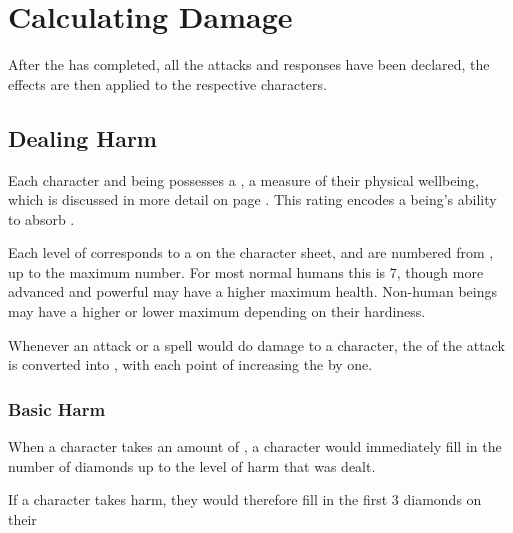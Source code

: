 \chapter{Calculating Damage}


After the  has completed, all the attacks and responses have been declared, the effects are then applied to the respective characters. 



\section{Dealing Harm}

Each character and being possesses a , a measure of their physical wellbeing, which is discussed in more detail on page \pageref{S:Health}. This  rating encodes a being's ability to absorb .

Each level of  corresponds to a  on the character sheet, and are numbered from , up to the maximum number. For most normal humans this is 7, though more advanced and powerful may have a higher maximum health. Non-human beings may have a higher or lower maximum  depending on their hardiness. 

Whenever an attack or a spell would do damage to a character, the  of the attack is converted into , with each point of  increasing the  by one.  

\subsection{Basic Harm}

When a character takes an amount of , a character would immediately fill in the number of diamonds up to the level of harm that was dealt. 

If a character takes  harm, they would therefore fill in the first 3 diamonds on their 

\newcommand\df[1]
{
	\begin{tikzpicture}
		\def\r{0.1}
		\def\theta{45}
		\def\dfill{white}
		\if#15
			\def\dfill{black}
		\fi
		\draw[rotate =\theta,fill = \dfill] ({-\r},{-\r}) rectangle ({\r},{\r});
		
		\ifnum#1>0
			\draw[rotate =\theta] ({0},{-\r}) -- ({0},{\r});
			
			\ifnum#1>1
				\draw[rotate =\theta,fill = \dfill] ({-\r},{0}) -- ({\r},{0});
				\ifnum#1>2
					\draw[rotate =\theta,fill = \dfill] ({-\r},{-\r}) -- ({\r},{\r});
					
					\ifnum#1>3
						\draw[rotate =\theta,fill = \dfill] ({-\r},{\r}) -- ({\r},{-\r});
					\fi
					
				\fi
			\fi
		\fi
		
	\end{tikzpicture}
}

